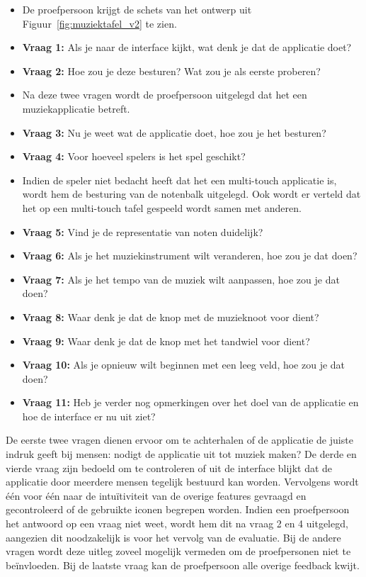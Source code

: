 \documentclass{acm}
\begin{document}
\begin{itemize}
  \item De proefpersoon krijgt de schets van het ontwerp uit Figuur~\ref{fig:muziektafel_v2} te zien.
  \item \textbf{Vraag 1:} Als je naar de interface kijkt, wat denk je dat de applicatie doet?
  \item \textbf{Vraag 2:} Hoe zou je deze besturen? Wat zou je als eerste proberen?
  \item Na deze twee vragen wordt de proefpersoon uitgelegd dat het een muziekapplicatie betreft.
  \item \textbf{Vraag 3:} Nu je weet wat de applicatie doet, hoe zou je het besturen?
  \item \textbf{Vraag 4:} Voor hoeveel spelers is het spel geschikt?
  \item Indien de speler niet bedacht heeft dat het een multi-touch applicatie is, wordt hem de besturing van de notenbalk uitgelegd. Ook wordt er verteld dat het op een multi-touch tafel gespeeld wordt samen met anderen.
  \item \textbf{Vraag 5:} Vind je de representatie van noten duidelijk?
  \item \textbf{Vraag 6:} Als je het muziekinstrument wilt veranderen, hoe zou je dat doen?
  \item \textbf{Vraag 7:} Als je het tempo van de muziek wilt aanpassen, hoe zou je dat doen?
  \item \textbf{Vraag 8:} Waar denk je dat de knop met de muzieknoot voor dient?
  \item \textbf{Vraag 9:} Waar denk je dat de knop met het tandwiel voor dient?
  \item \textbf{Vraag 10:} Als je opnieuw wilt beginnen met een leeg veld, hoe zou je dat doen?
  \item \textbf{Vraag 11:} Heb je verder nog opmerkingen over het doel van de applicatie en hoe de interface er nu uit ziet?
\end{itemize}

De eerste twee vragen dienen ervoor om te achterhalen of de applicatie de juiste indruk geeft bij mensen: nodigt de applicatie uit tot muziek maken? De derde en vierde vraag zijn bedoeld om te controleren of uit de interface blijkt dat de applicatie door meerdere mensen tegelijk bestuurd kan worden. Vervolgens wordt \'e\'en voor \'e\'en naar de intu\"itiviteit van de overige features gevraagd en gecontroleerd of de gebruikte iconen begrepen worden. Indien een proefpersoon het antwoord op een vraag niet weet, wordt hem dit na vraag 2 en 4 uitgelegd, aangezien dit noodzakelijk is voor het vervolg van de evaluatie. Bij de andere vragen wordt deze uitleg zoveel mogelijk vermeden om de proefpersonen niet te be\"invloeden. Bij de laatste vraag kan de proefpersoon alle overige feedback kwijt.
\end{document}
